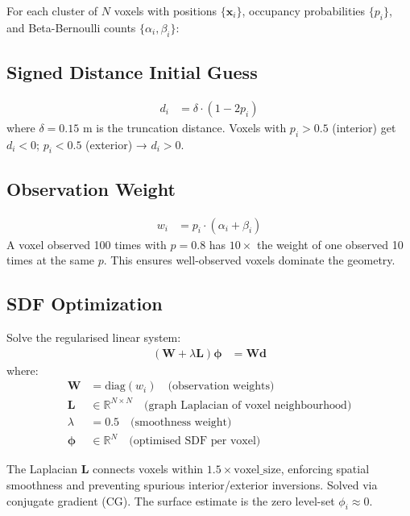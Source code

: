 \documentclass[10pt,twocolumn]{article}
\begin{document}
For each cluster of $N$ voxels with positions $\{\mathbf{x}_i\}$, occupancy probabilities $\{p_i\}$, and Beta-Bernoulli counts $\{\alpha_i, \beta_i\}$:

\subsection{Signed Distance Initial Guess}

\begin{align}
d_i &= \delta \cdot (1 - 2p_i) \label{eq:sdf_init}
\end{align}
where $\delta = 0.15$ m is the truncation distance. Voxels with $p_i > 0.5$ (interior) get $d_i < 0$; $p_i < 0.5$ (exterior) → $d_i > 0$.

\subsection{Observation Weight}

\begin{align}
w_i &= p_i \cdot (\alpha_i + \beta_i) \label{eq:obs_weight}
\end{align}
A voxel observed 100 times with $p=0.8$ has $10\times$ the weight of one observed 10 times at the same $p$. This ensures well-observed voxels dominate the geometry.

\subsection{SDF Optimization}

Solve the regularised linear system:
\begin{align}
(\mathbf{W} + \lambda \mathbf{L}) \boldsymbol{\phi} &= \mathbf{W} \mathbf{d} \label{eq:sdf_system}
\end{align}
where:
\begin{align}
\mathbf{W} &= \text{diag}(w_i) \quad \text{(observation weights)} \\
\mathbf{L} &\in \mathbb{R}^{N \times N} \quad \text{(graph Laplacian of voxel neighbourhood)} \\
\lambda &= 0.5 \quad \text{(smoothness weight)} \\
\boldsymbol{\phi} &\in \mathbb{R}^N \quad \text{(optimised SDF per voxel)}
\end{align}

The Laplacian $\mathbf{L}$ connects voxels within $1.5 \times \text{voxel\_size}$, enforcing spatial smoothness and preventing spurious interior/exterior inversions. Solved via conjugate gradient (CG). The surface estimate is the zero level-set $\phi_i \approx 0$.
\end{document}
